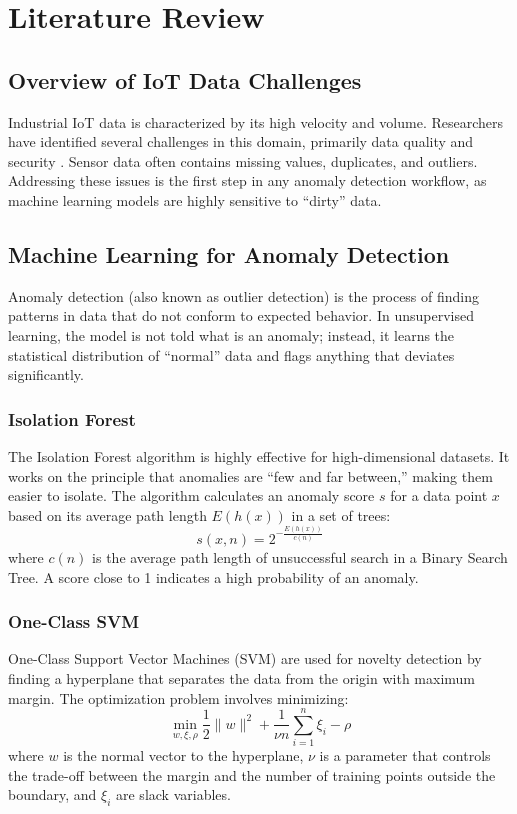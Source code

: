 \chapter{Literature Review}

\section{Overview of IoT Data Challenges}
Industrial IoT data is characterized by its high velocity and volume. Researchers have identified several challenges in this domain, primarily data quality and security \cite{smith2023}. Sensor data often contains missing values, duplicates, and outliers. Addressing these issues is the first step in any anomaly detection workflow, as machine learning models are highly sensitive to ``dirty'' data.

\section{Machine Learning for Anomaly Detection}
Anomaly detection (also known as outlier detection) is the process of finding patterns in data that do not conform to expected behavior. In unsupervised learning, the model is not told what is an anomaly; instead, it learns the statistical distribution of ``normal'' data and flags anything that deviates significantly.

\subsection{Isolation Forest}
The Isolation Forest algorithm \cite{liu2008} is highly effective for high-dimensional datasets. It works on the principle that anomalies are ``few and far between,'' making them easier to isolate. The algorithm calculates an anomaly score $s$ for a data point $x$ based on its average path length $E(h(x))$ in a set of trees:
\begin{equation}
s(x, n) = 2^{-\frac{E(h(x))}{c(n)}}
\end{equation}
where $c(n)$ is the average path length of unsuccessful search in a Binary Search Tree. A score close to 1 indicates a high probability of an anomaly.

\subsection{One-Class SVM}
One-Class Support Vector Machines (SVM) \cite{scholkopf2001} are used for novelty detection by finding a hyperplane that separates the data from the origin with maximum margin. The optimization problem involves minimizing:
\begin{equation}
\min_{w, \xi, \rho} \frac{1}{2} \|w\|^2 + \frac{1}{\nu n} \sum_{i=1}^{n} \xi_i - \rho
\end{equation}
where $w$ is the normal vector to the hyperplane, $\nu$ is a parameter that controls the trade-off between the margin and the number of training points outside the boundary, and $\xi_i$ are slack variables.

